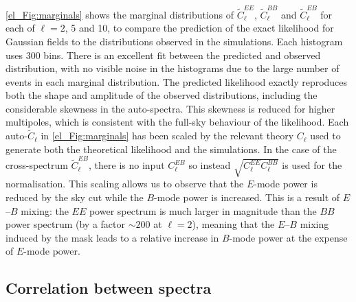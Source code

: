 \autoref{el_Fig:marginals} shows the marginal distributions of $\widetilde{C}_\ell^{EE}$, $\widetilde{C}_\ell^{BB}$ and $\widetilde{C}_\ell^{EB}$ for each of $\ell = 2$, 5 and 10, to compare the prediction of the exact likelihood for Gaussian fields to the distributions observed in the simulations. Each histogram uses 300 bins. There is an excellent fit between the predicted and observed distribution, with no visible noise in the histograms due to the large number of events in each marginal distribution. The predicted likelihood exactly reproduces both the shape and amplitude of the observed distributions, including the considerable skewness in the auto-spectra. This skewness is reduced for higher multipoles, which is consistent with the full-sky behaviour of the likelihood.
Each auto-$\widetilde{C}_\ell$ in \autoref{el_Fig:marginals} has been scaled by the relevant theory $C_\ell$ used to generate both the theoretical likelihood and the simulations. In the case of the cross-spectrum $\widetilde{C}_\ell^{EB}$, there is no input $C_\ell^{EB}$ so instead $\sqrt{ C_\ell^{EE} C_\ell^{BB} }$ is used for the normalisation. This scaling allows us to observe that the $E$-mode power is reduced by the sky cut while the $B$-mode power is increased. This is a result of $E$--$B$ mixing: the $EE$ power spectrum is much larger in magnitude than the $BB$ power spectrum (by a factor $\sim 200$ at $\ell = 2$), meaning that the $E$--$B$ mixing induced by the mask leads to a relative increase in $B$-mode power at the expense of $E$-mode power.

\subsection{Correlation between spectra}

